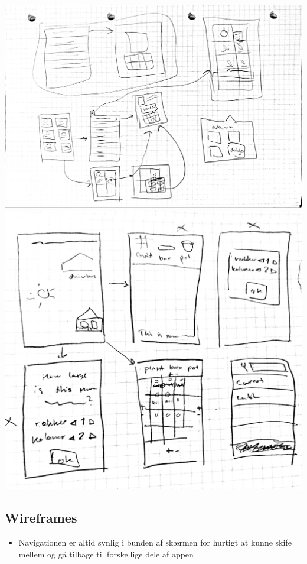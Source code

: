 \includegraphics[width=1\textwidth]{img/s1-7.jpg}\\
\includegraphics[width=1\textwidth]{img/s1-9.jpg}\\

\subsection{Wireframes}

\begin{itemize}
    \item Navigationen er altid synlig i bunden af skærmen for hurtigt at kunne skife mellem og gå tilbage til forskellige dele af appen
\end{itemize}

